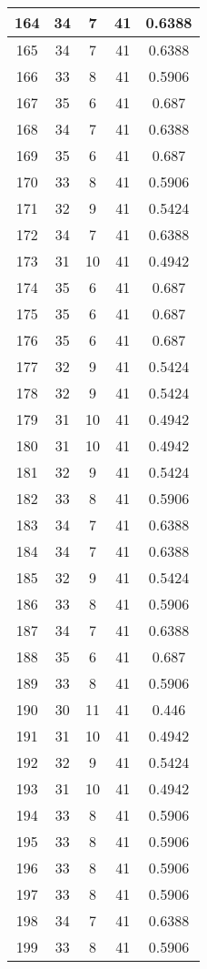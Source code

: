 \documentclass[letterpaper, 12pt]{article}
\begin{document}
\begin{longtable}{|c|c|c|c|c|}
\hline
164 & 34 & 7 & 41 & 0.6388 \\
\hline
165 & 34 & 7 & 41 & 0.6388 \\
\hline
166 & 33 & 8 & 41 & 0.5906 \\
\hline
167 & 35 & 6 & 41 & 0.687 \\
\hline
168 & 34 & 7 & 41 & 0.6388 \\
\hline
169 & 35 & 6 & 41 & 0.687 \\
\hline
170 & 33 & 8 & 41 & 0.5906 \\
\hline
171 & 32 & 9 & 41 & 0.5424 \\
\hline
172 & 34 & 7 & 41 & 0.6388 \\
\hline
173 & 31 & 10 & 41 & 0.4942 \\
\hline
174 & 35 & 6 & 41 & 0.687 \\
\hline
175 & 35 & 6 & 41 & 0.687 \\
\hline
176 & 35 & 6 & 41 & 0.687 \\
\hline
177 & 32 & 9 & 41 & 0.5424 \\
\hline
178 & 32 & 9 & 41 & 0.5424 \\
\hline
179 & 31 & 10 & 41 & 0.4942 \\
\hline
180 & 31 & 10 & 41 & 0.4942 \\
\hline
181 & 32 & 9 & 41 & 0.5424 \\
\hline
182 & 33 & 8 & 41 & 0.5906 \\
\hline
183 & 34 & 7 & 41 & 0.6388 \\
\hline
184 & 34 & 7 & 41 & 0.6388 \\
\hline
185 & 32 & 9 & 41 & 0.5424 \\
\hline
186 & 33 & 8 & 41 & 0.5906 \\
\hline
187 & 34 & 7 & 41 & 0.6388 \\
\hline
188 & 35 & 6 & 41 & 0.687 \\
\hline
189 & 33 & 8 & 41 & 0.5906 \\
\hline
190 & 30 & 11 & 41 & 0.446 \\
\hline
191 & 31 & 10 & 41 & 0.4942 \\
\hline
192 & 32 & 9 & 41 & 0.5424 \\
\hline
193 & 31 & 10 & 41 & 0.4942 \\
\hline
194 & 33 & 8 & 41 & 0.5906 \\
\hline
195 & 33 & 8 & 41 & 0.5906 \\
\hline
196 & 33 & 8 & 41 & 0.5906 \\
\hline
197 & 33 & 8 & 41 & 0.5906 \\
\hline
198 & 34 & 7 & 41 & 0.6388 \\
\hline
199 & 33 & 8 & 41 & 0.5906 \\
\hline
\end{longtable}
\end{document}
